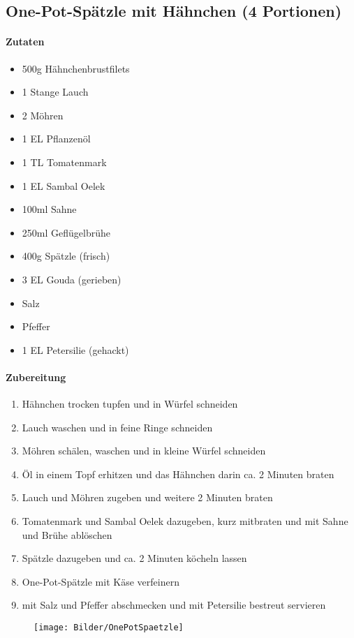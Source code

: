 \newpage
\subsection{One-Pot-Spätzle mit Hähnchen (4 Portionen)}
\paragraph{Zutaten}
\begin{itemize}[noitemsep]
	\item 500g Hähnchenbrustfilets
	\item 1 Stange Lauch
	\item 2 Möhren
	\item 1 EL Pflanzenöl
	\item 1 TL Tomatenmark
	\item 1 EL Sambal Oelek
	\item 100ml Sahne
	\item 250ml Geflügelbrühe
	\item 400g Spätzle (frisch)
	\item 3 EL Gouda (gerieben)
	\item Salz
	\item Pfeffer
	\item 1 EL Petersilie (gehackt)
\end{itemize}
\paragraph{Zubereitung}
\begin{enumerate}[noitemsep]
	\item Hähnchen trocken tupfen und in Würfel schneiden
	\item Lauch waschen und in feine Ringe schneiden
	\item Möhren schälen, waschen und in kleine Würfel schneiden
	\item Öl in einem Topf erhitzen und das Hähnchen darin ca. 2 Minuten braten
	\item Lauch und Möhren zugeben und weitere 2 Minuten braten
	\item Tomatenmark und Sambal Oelek dazugeben, kurz mitbraten und mit Sahne und Brühe ablöschen
	\item Spätzle dazugeben und ca. 2 Minuten köcheln lassen
	\item One-Pot-Spätzle mit Käse verfeinern
	\item mit Salz und Pfeffer abschmecken und mit Petersilie bestreut servieren
\end{enumerate}
\begin{figure}[h]
\centering
\texttt{[image: Bilder/OnePotSpaetzle]}
\end{figure}
